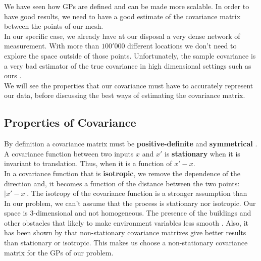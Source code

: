 We have seen how GPs are defined and can be made more scalable. In order to have good results, we need to have a good estimate of the covariance matrix between the points of our mesh. \\




In our specific case, we already have at our disposal a very dense network of measurement. With more than $100'000$ different locations we don't need to explore the space outside of those points. Unfortunately, the sample covariance is a very bad estimator of the true covariance in high dimensional settings such as ours \citep{pourahmadi_covariance_2011}. \\


We will see the properties that our covariance must have to accurately represent our data, before discussing the best ways of estimating the covariance matrix.


\subsection{Properties of Covariance}

By definition a covariance matrix must be \textbf{positive-definite} and \textbf{symmetrical} \citep[p.~80]{rasmussen_gaussian_2006}. \\

A covariance function between two inputs $x$ and $x'$ is \textbf{stationary}   when it is invariant to translation. Thus, when it is a function of $x' - x$. \\
In a covariance function that is \textbf{isotropic}, we remove the dependence of the direction and, it becomes a function of the distance between the two points: $|x' - x|$. The isotropy of the covariance function is a stronger assumption than  \\ 

In our problem, we can't assume that the process is stationary nor isotropic. Our space is 3-dimensional and not homogeneous. The presence of the buildings and other obstacles that likely to make environment variables less smooth \citep{paciorek_nonstationary_2004}. Also, it has been shown by \citet{krause_near-optimal_2008} that non-stationary covariance matrixes give better results than stationary or isotropic. This makes us choose a non-stationary covariance matrix for the  GPs of our problem.



